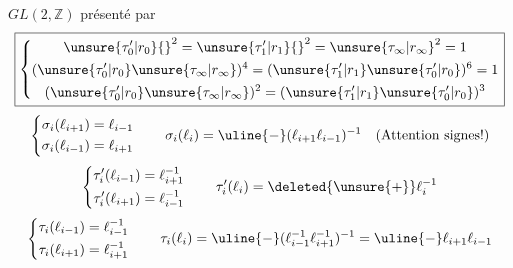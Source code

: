 $GL(2,\mathbb Z)$ présenté par
\[
\boxed{\left\{\begin{gathered}
\unsure{\tau'_0|r_0}{}^2=\unsure{\tau'_1|r_1}{}^2=\unsure{\tau_\infty|r_\infty}^2=1\\
(\unsure{\tau'_0|r_0}\unsure{\tau_\infty|r_\infty})^4=(\unsure{\tau'_1|r_1}\unsure{\tau'_0|r_0})^6=1\\
(\unsure{\tau'_0|r_0}\unsure{\tau_\infty|r_\infty})^2=(\unsure{\tau'_1|r_1}\unsure{\tau'_0|r_0})^3
\end{gathered}\right.}
\]
\[
\left\{\begin{aligned}\sigma_i(\ell_{i+1})&=\ell_{i-1}\\\sigma_i(\ell_{i-1})&=\ell_{i+1}\end{aligned}\right.
\qquad\sigma_i(\ell_i)=\uline{-}(\ell_{i+1}\ell_{i-1})^{-1}\quad(\text{Attention signes!})
\]
\[
\left\{\begin{aligned}\tau'_i(\ell_{i-1})&=\ell_{i+1}^{-1}\\\tau'_i(\ell_{i+1})&=\ell_{i-1}^{-1}\end{aligned}\right.
\qquad\tau'_i(\ell_i)=\deleted{\unsure{+}}\ell_i^{-1}
\]
\[
\left\{\begin{aligned}\tau_i(\ell_{i-1})&=\ell_{i-1}^{-1}\\\tau_i(\ell_{i+1})&=\ell_{i+1}^{-1}\end{aligned}\right.
\qquad\tau_i(\ell_i)=\uline{-}(\ell_{i-1}^{-1}\ell_{i+1}^{-1})^{-1}=\uline{-}\ell_{i+1}\ell_{i-1}
\]
